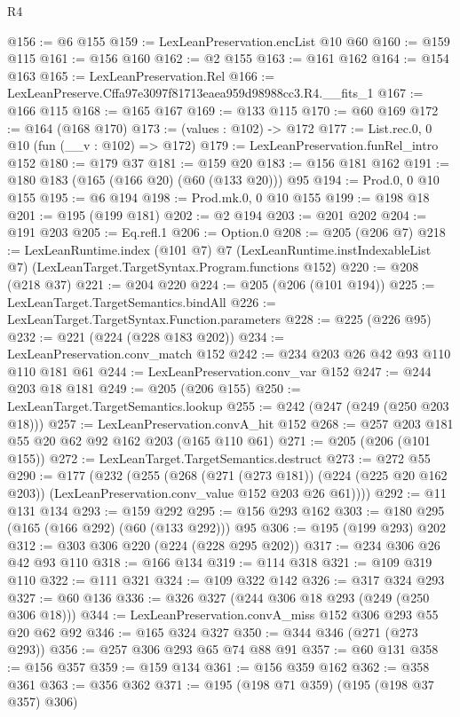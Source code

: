 \begin{lexlean}{R4}
\begin{coremodule}
@156 := @6 @155
@159 := LexLeanPreservation.encList @10 @60
@160 := @159 @115
@161 := @156 @160
@162 := @2 @155
@163 := @161 @162
@164 := @154 @163
@165 := LexLeanPreservation.Rel
@166 := LexLeanPreserve.Cffa97e3097f81713eaea959d98988cc3.R4.__fits_1
@167 := @166 @115
@168 := @165 @167
@169 := @133 @115
@170 := @60 @169
@172 := @164 (@168 @170)
@173 := (values : @102) -> @172
@177 := List.rec.{0, 0} @10 (fun (__v : @102) => @172)
@179 := LexLeanPreservation.funRel_intro @152
@180 := @179 @37
@181 := @159 @20
@183 := @156 @181 @162
@191 := @180 @183 (@165 (@166 @20) (@60 (@133 @20))) @95
@194 := Prod.{0, 0} @10 @155
@195 := @6 @194
@198 := Prod.mk.{0, 0} @10 @155
@199 := @198 @18
@201 := @195 (@199 @181)
@202 := @2 @194
@203 := @201 @202
@204 := @191 @203
@205 := Eq.refl.{1}
@206 := Option.{0}
@208 := @205 (@206 @7)
@218 := LexLeanRuntime.index
    (@101 @7)
    @7
    (LexLeanRuntime.instIndexableList @7)
    (LexLeanTarget.TargetSyntax.Program.functions @152)
@220 := @208 (@218 @37)
@221 := @204 @220
@224 := @205 (@206 (@101 @194))
@225 := LexLeanTarget.TargetSemantics.bindAll
@226 := LexLeanTarget.TargetSyntax.Function.parameters
@228 := @225 (@226 @95)
@232 := @221 (@224 (@228 @183 @202))
@234 := LexLeanPreservation.conv_match @152
@242 := @234 @203 @26 @42 @93 @110 @110 @181 @61
@244 := LexLeanPreservation.conv_var @152
@247 := @244 @203 @18 @181
@249 := @205 (@206 @155)
@250 := LexLeanTarget.TargetSemantics.lookup
@255 := @242 (@247 (@249 (@250 @203 @18)))
@257 := LexLeanPreservation.convA_hit @152
@268 := @257 @203 @181 @55 @20 @62 @92 @162 @203 (@165 @110 @61)
@271 := @205 (@206 (@101 @155))
@272 := LexLeanTarget.TargetSemantics.destruct
@273 := @272 @55
@290 := @177
    (@232
      (@255
        (@268
          (@271 (@273 @181))
          (@224 (@225 @20 @162 @203))
          (LexLeanPreservation.conv_value @152 @203 @26 @61))))
@292 := @11 @131 @134
@293 := @159 @292
@295 := @156 @293 @162
@303 := @180 @295 (@165 (@166 @292) (@60 (@133 @292))) @95
@306 := @195 (@199 @293) @202
@312 := @303 @306 @220 (@224 (@228 @295 @202))
@317 := @234 @306 @26 @42 @93 @110
@318 := @166 @134
@319 := @114 @318
@321 := @109 @319 @110
@322 := @111 @321
@324 := @109 @322 @142
@326 := @317 @324 @293
@327 := @60 @136
@336 := @326 @327 (@244 @306 @18 @293 (@249 (@250 @306 @18)))
@344 := LexLeanPreservation.convA_miss @152 @306 @293 @55 @20 @62 @92
@346 := @165 @324 @327
@350 := @344 @346 (@271 (@273 @293))
@356 := @257 @306 @293 @65 @74 @88 @91
@357 := @60 @131
@358 := @156 @357
@359 := @159 @134
@361 := @156 @359 @162
@362 := @358 @361
@363 := @356 @362
@371 := @195 (@198 @71 @359) (@195 (@198 @37 @357) @306)

\end{coremodule}
\end{lexlean}
